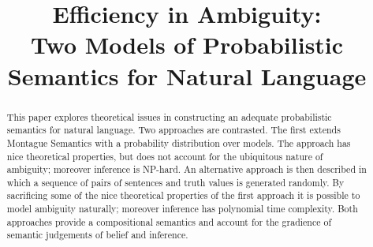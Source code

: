 \documentclass[a4paper,11pt]{article}
\title{Efficiency in Ambiguity:\\ Two Models of Probabilistic Semantics for Natural Language}
\author{}
\date{}
\theoremstyle{definition}
\begin{document}
\maketitle
\begin{abstract}
This paper explores theoretical issues in constructing an adequate probabilistic semantics for natural language. Two approaches are contrasted. The first extends Montague
Semantics with a probability distribution over 
models. The approach has nice theoretical properties, but does
not account for the ubiquitous nature of ambiguity; moreover inference is
NP-hard. An alternative approach is then described in which a sequence of pairs of sentences and truth values is generated
randomly. By sacrificing some of the nice theoretical properties of
the first approach it is possible to model ambiguity naturally;
moreover inference has polynomial time
complexity. Both approaches provide a compositional semantics and account for the gradience of semantic judgements of belief and inference.  
\end{abstract}



\end{document}
